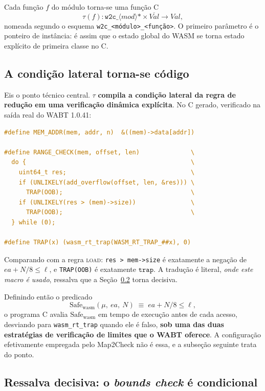 \documentclass[11pt,a4paper]{article}
\theoremstyle{definition}
\newcommand{\Safe}{\mathrm{Safe}}
\newcommand{\wasm}{\mathrm{wasm}}
\newcommand{\code}[1]{\texttt{#1}}
\begin{document}
Cada função $f$ do módulo torna-se uma função C
\[
  \tau(f) : \code{w2c\_}\langle \mathit{mod} \rangle \code{*}
            \times \overline{\mathit{Val}} \longrightarrow \mathit{Val},
\]
nomeada segundo o esquema \code{w2c\_<módulo>\_<função>}. O primeiro parâmetro é
o ponteiro de instância: é assim que o estado global do WASM se torna estado
explícito de primeira classe no C.

\subsection{A condição lateral torna-se código}

Eis o ponto técnico central. $\tau$ \textbf{compila a condição lateral da regra de
redução em uma verificação dinâmica explícita}. No C gerado, verificado na saída
real do WABT 1.0.41:

\begin{lstlisting}[language=C]
#define MEM_ADDR(mem, addr, n)  &((mem)->data[addr])

#define RANGE_CHECK(mem, offset, len)              \
  do {                                             \
    uint64_t res;                                  \
    if (UNLIKELY(add_overflow(offset, len, &res))) \
      TRAP(OOB);                                   \
    if (UNLIKELY(res > (mem)->size))               \
      TRAP(OOB);                                   \
  } while (0);

#define TRAP(x) (wasm_rt_trap(WASM_RT_TRAP_##x), 0)
\end{lstlisting}

Comparando com a regra \textsc{load}: \code{res > mem->size} é exatamente a
negação de $ea + N/8 \le \ell$, e \code{TRAP(OOB)} é exatamente $\mathtt{trap}$.
A tradução é literal, \emph{onde este macro é usado}, ressalva que a
Seção~\ref{sec:guardpages} torna decisiva.

Definindo então o predicado
\[
  \Safe_{\wasm}(\mu,\ ea,\ N) \;\equiv\; ea + N/8 \le \ell,
\]
o programa C avalia $\Safe_{\wasm}$ em tempo de execução antes de cada acesso,
desviando para \code{wasm\_rt\_trap} quando ele é falso, \textbf{sob uma das
duas estratégias de verificação de limites que o WABT oferece}. A configuração
efetivamente empregada pelo Map2Check não é essa, e a subseção seguinte trata do
ponto.

\subsection{Ressalva decisiva: o \emph{bounds check} é condicional}
\label{sec:guardpages}
\end{document}
